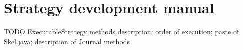 \chapter{Strategy development manual}\label{appendix:devman}

TODO ExecutableStrategy methods description; order of execution; paste of
Skel.java; description of Journal methods
